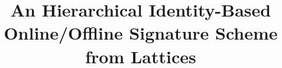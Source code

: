 \documentclass[paper]{ieice}
\title{An Hierarchical Identity-Based Online/Offline Signature Scheme from Lattices}
\begin{document}
\maketitle
\begin{summary}

\end{summary}
\begin{keywords}

\end{keywords}

\section{}



\begin{thebibliography}{99}%
\bibitem{}
\end{thebibliography}

\profile{}{}
\end{document}

